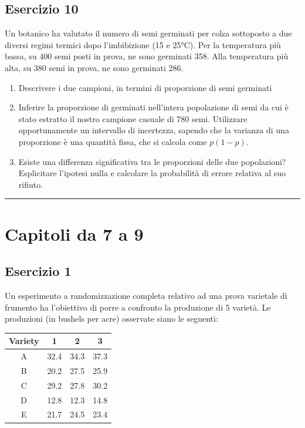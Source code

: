 \documentclass[a4paper,12pt,oneside]{book}
\providecommand{\tightlist}{%
  \setlength{\itemsep}{0pt}\setlength{\parskip}{0pt}}
\begin{document}
\hypertarget{esercizio-10}{%
\subsection{Esercizio 10}\label{esercizio-10}}

Un botanico ha valutato il numero di semi germinati per colza sottoposto a due diversi regimi termici dopo l'imbibizione (15 e 25°C). Per la temperatura più bassa, su 400 semi posti in prova, ne sono germinati 358. Alla temperatura più alta, su 380 semi in prova, ne sono germinati 286.

\begin{enumerate}
\def\labelenumi{\arabic{enumi}.}
\tightlist
\item
  Descrivere i due campioni, in termini di proporzione di semi germinati
\item
  Inferire la proporzione di germinati nell'intera popolazione di semi da cui è stato estratto il nostro campione casuale di 780 semi. Utilizzare opportunamente un intervallo di incertezza, sapendo che la varianza di una proporzione è una quantità fissa, che si calcola come \(p ( 1- p)\).
\item
  Esiste una differenza significativa tra le proporzioni delle due popolazioni? Esplicitare l'ipotesi nulla e calcolare la probabilità di errore relativa al suo rifiuto.
\end{enumerate}

\begin{center}\rule{0.5\linewidth}{0.5pt}\end{center}

\hypertarget{capitoli-da-7-a-9}{%
\section{Capitoli da 7 a 9}\label{capitoli-da-7-a-9}}

\hypertarget{esercizio-1-5}{%
\subsection{Esercizio 1}\label{esercizio-1-5}}

Un esperimento a randomizzazione completa relativo ad una prova varietale di frumento ha l'obiettivo di porre a confronto la produzione di 5 varietà. Le produzioni (in bushels per acre) osservate siano le seguenti:

\begin{longtable}[]{@{}cccc@{}}
\toprule
Variety & 1 & 2 & 3 \\
\midrule
\endhead
A & 32.4 & 34.3 & 37.3 \\
B & 20.2 & 27.5 & 25.9 \\
C & 29.2 & 27.8 & 30.2 \\
D & 12.8 & 12.3 & 14.8 \\
E & 21.7 & 24.5 & 23.4 \\
\bottomrule
\end{longtable}
\end{document}
